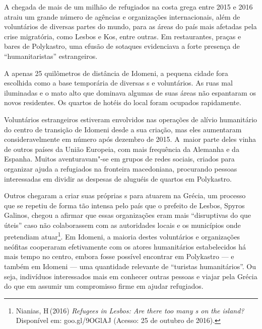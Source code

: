 
\putodd{}
\clearpage
{}
 

A chegada de mais de um milhão de refugiados na costa grega entre 2015 e
2016 atraiu um grande número de agências e organizações internacionais,
além de voluntários de diversas partes do mundo, para as áreas do país
mais afetadas pela crise migratória, como Lesbos e Kos, entre outras. Em
restaurantes, praças e bares de Polykastro, uma efusão de sotaques
evidenciava a forte presença de ``humanitaristas'' estrangeiros.

A apenas 25 quilômetros de distância de Idomeni, a pequena cidade fora
escolhida como a base temporária de diversas s e voluntários. As ruas
mal iluminadas e o mato alto que dominava algumas de suas áreas não
espantaram os novos residentes. Os quartos de hotéis do local foram
ocupados rapidamente.

Voluntários estrangeiros estiveram envolvidos nas operações de alívio
humanitário do centro de transição de Idomeni desde a sua criação, mas
eles aumentaram consideravelmente em número após dezembro de 2015. A~maior parte deles vinha de outros países da União Europeia, com mais
frequência da Alemanha e da Espanha. Muitos aventuravam"-se em grupos de
redes sociais, criados para organizar ajuda a refugiados na fronteira
macedoniana, procurando pessoas interessadas em dividir as despesas de
aluguéis de quartos em Polykastro.

Outros chegaram a criar suas próprias s para atuarem na Grécia, um
processo que se repetiu de forma tão intensa pelo país que o prefeito de
Lesbos, Spyros Galinos, chegou a afirmar que essas organizações eram
mais ``disruptivas do que úteis'' caso não colaborassem com as
autoridades locais e os municípios onde pretendiam
atuar\footnote{ Nianias, H\,(2016) \emph{Refugees in Lesbos: Are
there too many s on the island?} Disponível em:
goo.gl/9OGlAJ
(Acesso: 25 de outubro de 2016).}. Em Idomeni, a maioria destes voluntários e
organizações neófitas cooperaram efetivamente com os atores humanitários
estabelecidos há mais tempo no centro, embora fosse possível encontrar
em Polykastro --- e também em Idomeni --- uma quantidade relevante de
``turistas humanitários''. Ou seja, indivíduos interessados mais em
conhecer outras pessoas e viajar pela Grécia do que em assumir um
compromisso firme em ajudar refugiados.

